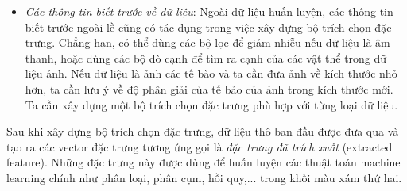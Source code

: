 \begin{itemize}
    \item \textit{Các thông tin biết trước về dữ liệu}: Ngoài dữ liệu huấn luyện, các thông tin biết trước ngoài lề cũng có tác dụng trong việc xây dựng bộ trích chọn đặc trưng. Chẳng hạn, có thể dùng các bộ lọc để giảm nhiễu nếu dữ liệu là âm thanh, hoặc dùng các bộ dò cạnh để tìm ra cạnh của các vật thể trong dữ liệu ảnh. Nếu dữ liệu là ảnh các tế bào và ta cần đưa ảnh về kích thước nhỏ hơn, ta cần lưu ý về độ phân giải của tế bảo của ảnh trong kích thước mới. Ta cần xây dựng một bộ trích chọn đặc trưng phù hợp với từng loại dữ liệu. 
\end{itemize}

Sau khi xây dựng bộ trích chọn đặc trưng, dữ liệu thô ban đầu được đưa qua và
tạo ra các vector đặc trưng tương ứng gọi là \textit{đặc trưng đã trích
xuất} ({extracted feature}). Những đặc trưng này được dùng để huấn luyện
các thuật toán machine learning chính như phân loại, phân cụm, hồi quy,... trong
khối màu xám thứ hai.



 
